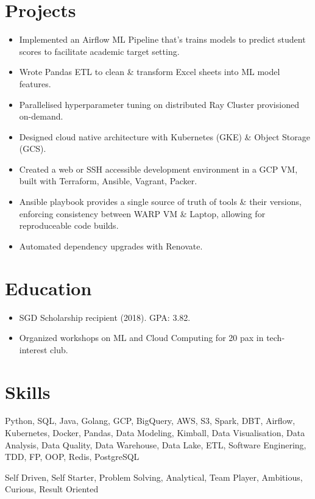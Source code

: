 \section{Projects}
\begin{itemize}
  \item Implemented an Airflow ML Pipeline that's trains models to predict student scores
    to facilitate academic target setting.
  \item Wrote Pandas ETL to clean \& transform Excel sheets into ML model features.
  \item Parallelised hyperparameter tuning on distributed Ray Cluster provisioned on-demand.
  \item Designed cloud native architecture with Kubernetes (GKE) \& Object Storage (GCS).
\end{itemize}

\begin{itemize}
  \item Created a web or SSH accessible development environment in a GCP VM,
    built with Terraform, Ansible, Vagrant, Packer.
  \item Ansible playbook provides a single source of truth of tools \& their versions,
    enforcing consistency between WARP VM \& Laptop, allowing for reproduceable code builds.
  \item Automated dependency upgrades with Renovate.
\end{itemize}
  
\section{Education}
\begin{itemize}
  \item SGD Scholarship recipient (2018). GPA: 3.82.
  \item Organized workshops on ML and Cloud Computing for 20 pax in tech-interest club.
\end{itemize}

\section{Skills}
\begin{description}
  \footnotesize{
  \item[Technical] Python, SQL, Java, Golang, GCP, BigQuery, AWS, S3, Spark, DBT, Airflow, Kubernetes, Docker, Pandas, Data Modeling, Kimball, Data Visualisation, Data Analysis, Data Quality, Data Warehouse, Data Lake, ETL, Software Enginering, TDD, FP, OOP, Redis, PostgreSQL
  \item[People]
    Self Driven, Self Starter, Problem Solving, Analytical, Team Player, Ambitious, Curious, Result Oriented
  }
\end{description}

